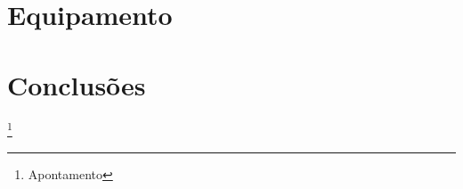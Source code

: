 \section{Equipamento}
\newpage
\newpage
\section{Conclusões}

\newpage
\listoffigures
\cite{*}

\newpage
\footnote{Apontamento}

